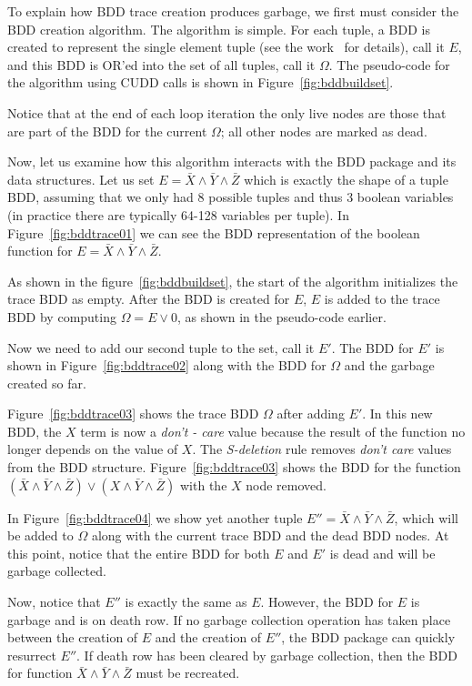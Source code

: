 {To explain how BDD trace creation produces garbage, we first must consider the BDD creation algorithm.  The algorithm is simple.  For each tuple, a BDD is created to represent the single element tuple (see the work~\cite{price:06:cal} for details), call it $E$, and this BDD is OR'ed into the set of all tuples, call it $\Omega$.  The pseudo-code for the algorithm using CUDD calls is shown in Figure~\ref{fig:bddbuildset}.

Notice that at the end of each loop iteration the only live nodes are those that are part of the BDD for the current $\Omega$; all other nodes are marked as dead.

Now, let us examine how this algorithm interacts with the BDD package and its data structures.  Let us set $E = \bar{X}\land\bar{Y}\land\bar{Z}$ which is exactly the shape of a tuple BDD, assuming that we only had 8 possible tuples and thus 3 boolean variables (in practice there are typically 64-128 variables per tuple). In Figure~\ref{fig:bddtrace01} we can see the BDD representation of the boolean function for $E = \bar{X}\land\bar{Y}\land\bar{Z}$.

As shown in the figure~\ref{fig:bddbuildset}, the start of the algorithm initializes the trace BDD as empty.  After the BDD is created for $E$, $E$ is added to the trace BDD by computing $\Omega = E \lor 0$, as shown in the pseudo-code earlier.

Now we need to add our second tuple to the set, call it $E'$.  The BDD for $E'$ is shown in Figure~\ref{fig:bddtrace02} along with the BDD for $\Omega$ and the garbage created so far.

Figure~\ref{fig:bddtrace03} shows the trace BDD $\Omega$ after adding $E'$.  In this new BDD, the $X$ term is now a \textit{don't - care} value because the result of the function no longer depends on the value of $X$.  The \textit{S-deletion} rule removes \textit{don't care} values from the BDD structure.  Figure~\ref{fig:bddtrace03} shows the BDD for the function $(\bar{X}\land\bar{Y}\land\bar{Z})\lor(X\land\bar{Y}\land\bar{Z})$ with the $X$ node removed.

In Figure~\ref{fig:bddtrace04} we show yet another tuple $E'' = \bar{X}\land\bar{Y}\land\bar{Z}$, which will be added to $\Omega$ along with the current trace BDD and the dead BDD nodes.  At this point, notice that the entire BDD for both $E$ and $E'$ is dead and will be garbage collected.

Now, notice that $E''$ is exactly the same as $E$.  However, the BDD for $E$ is garbage and is on death row.  If no garbage collection operation has taken place between the creation of $E$ and the creation of $E''$, the BDD package can quickly resurrect $E''$.  If death row has been cleared by garbage collection, then the BDD for function $\bar{X}\land\bar{Y}\land\bar{Z}$ must be recreated.

}
